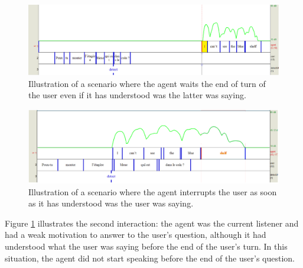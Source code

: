 \begin{figure}
\centering
\includegraphics[width=\linewidth]{figure/volume_transcript_2_2.png}
\caption{Illustration of a scenario where the agent waits the end of turn of the user even if it has understood was the latter was saying.}
\label{sc_3}
\end{figure}

\begin{figure}
\centering
\includegraphics[width=\linewidth]{figure/volume_transcript_2_1.png}
\caption{Illustration of a scenario where the agent interrupts the user as soon as it has understood was the user was saying.}
\label{sc_4}
\end{figure}

Figure \ref{sc_3} illustrates the second interaction: the agent was the current listener and had a weak motivation to answer to the user's question, although it had understood what the user was saying before the end of the user's turn. In this situation, the agent did not start speaking before the end of the user's question. 

